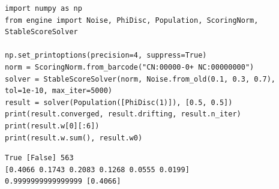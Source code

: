 \begin{lstlisting}[style=code]
import numpy as np
from engine import Noise, PhiDisc, Population, ScoringNorm, StableScoreSolver

np.set_printoptions(precision=4, suppress=True)
norm = ScoringNorm.from_barcode("CN:00000-0+ NC:00000000")
solver = StableScoreSolver(norm, Noise.from_old(0.1, 0.3, 0.7), tol=1e-10, max_iter=5000)
result = solver(Population([PhiDisc(1)]), [0.5, 0.5])
print(result.converged, result.drifting, result.n_iter)
print(result.w[0][:6])
print(result.w.sum(), result.w0)
\end{lstlisting}
\begin{lstlisting}[style=output]
True [False] 563
[0.4066 0.1743 0.2083 0.1268 0.0555 0.0199]
0.9999999999999999 [0.4066]
\end{lstlisting}
